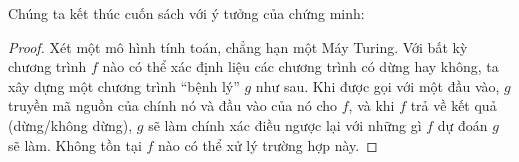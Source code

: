 Chúng ta kết thúc cuốn sách với ý tưởng của chứng minh:

\begin{proof}
Xét một mô hình tính toán, chẳng hạn một Máy Turing. Với bất kỳ chương trình $f$ nào có thể xác định liệu các chương trình có dừng hay không, ta xây dựng một chương trình ``bệnh lý'' $g$ như sau. Khi được gọi với một đầu vào, $g$ truyền mã nguồn của chính nó và đầu vào của nó cho $f$, và khi $f$ trả về kết quả (dừng/không dừng), $g$ sẽ làm chính xác điều ngược lại với những gì $f$ dự đoán $g$ sẽ làm. Không tồn tại $f$ nào có thể xử lý trường hợp này.
\end{proof}
